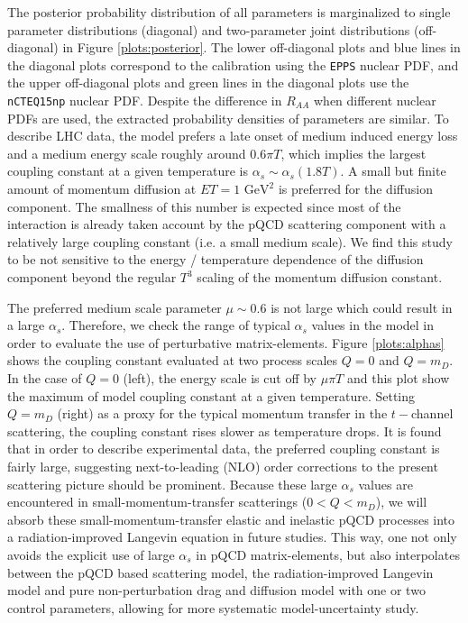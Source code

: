 The posterior probability distribution of all parameters is marginalized to single parameter distributions (diagonal) and two-parameter joint distributions (off-diagonal) in Figure \ref{plots:posterior}.
The lower off-diagonal plots and blue lines in the diagonal plots correspond to the calibration using the {\tt EPPS} nuclear PDF, and the upper off-diagonal plots and green lines in the diagonal plots use the {\tt nCTEQ15np} nuclear PDF.
Despite the difference in $R_{AA}$ when different nuclear PDFs are used, the extracted probability densities of parameters are similar.
To describe LHC data, the model prefers a late onset of medium induced energy loss and a medium energy scale roughly around $0.6\pi T$, which implies the largest coupling constant at a given temperature is $\alpha_s \sim \alpha_s(1.8T)$.
A small but finite amount of momentum diffusion at $ET=1\textrm{ GeV}^2$ is preferred for the diffusion component.
The smallness of this number is expected since most of the interaction is already taken account by the pQCD scattering component with a relatively large coupling constant (i.e. a small medium scale).
We find this study to be not sensitive to the energy / temperature dependence of the diffusion component beyond the regular $T^3$ scaling of the momentum diffusion constant.   

The preferred medium scale parameter $\mu \sim 0.6$ is not large which could result in a large $\alpha_s$.
Therefore, we check the range of typical $\alpha_s$ values in the model in order to evaluate the use of perturbative matrix-elements.
Figure \ref{plots:alphas} shows the coupling constant evaluated at two process scales $Q=0$ and $Q=m_D$.
In the case of $Q=0$ (left), the energy scale is cut off by $\mu\pi T$ and this plot show the maximum of model coupling constant at a given temperature.
Setting $Q=m_D$ (right) as a proxy for the typical momentum transfer in the $t-$channel scattering, the coupling constant rises slower as temperature drops.
It is found that in order to describe experimental data, the preferred coupling constant is fairly large, suggesting next-to-leading (NLO) order corrections to the present scattering picture should be prominent. 
Because these large $\alpha_s$ values are encountered in small-momentum-transfer scatterings ($0< Q < m_D$), we will absorb these small-momentum-transfer elastic and inelastic pQCD processes into a radiation-improved Langevin equation in future studies. 
This way, one not only avoids the explicit use of large $\alpha_s$ in pQCD matrix-elements, but also interpolates between the pQCD based scattering model, the radiation-improved Langevin model and pure non-perturbation drag and diffusion model with one or two control parameters, allowing for more systematic model-uncertainty study.

